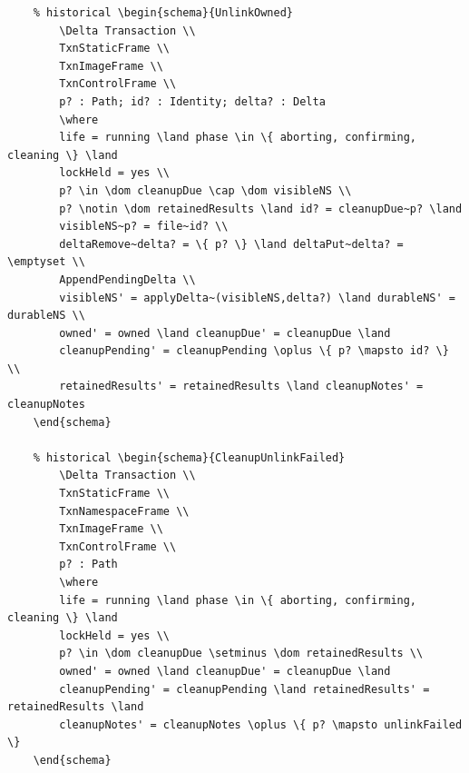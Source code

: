 \documentclass{article}
\begin{document}
\begin{verbatim}
	% historical \begin{schema}{UnlinkOwned}
		\Delta Transaction \\
		TxnStaticFrame \\
		TxnImageFrame \\
		TxnControlFrame \\
		p? : Path; id? : Identity; delta? : Delta
		\where
		life = running \land phase \in \{ aborting, confirming, cleaning \} \land
		lockHeld = yes \\
		p? \in \dom cleanupDue \cap \dom visibleNS \\
		p? \notin \dom retainedResults \land id? = cleanupDue~p? \land
		visibleNS~p? = file~id? \\
		deltaRemove~delta? = \{ p? \} \land deltaPut~delta? = \emptyset \\
		AppendPendingDelta \\
		visibleNS' = applyDelta~(visibleNS,delta?) \land durableNS' = durableNS \\
		owned' = owned \land cleanupDue' = cleanupDue \land
		cleanupPending' = cleanupPending \oplus \{ p? \mapsto id? \} \\
		retainedResults' = retainedResults \land cleanupNotes' = cleanupNotes
	\end{schema}

	% historical \begin{schema}{CleanupUnlinkFailed}
		\Delta Transaction \\
		TxnStaticFrame \\
		TxnNamespaceFrame \\
		TxnImageFrame \\
		TxnControlFrame \\
		p? : Path
		\where
		life = running \land phase \in \{ aborting, confirming, cleaning \} \land
		lockHeld = yes \\
		p? \in \dom cleanupDue \setminus \dom retainedResults \\
		owned' = owned \land cleanupDue' = cleanupDue \land
		cleanupPending' = cleanupPending \land retainedResults' = retainedResults \land
		cleanupNotes' = cleanupNotes \oplus \{ p? \mapsto unlinkFailed \}
	\end{schema}


\end{verbatim}
\end{document}
